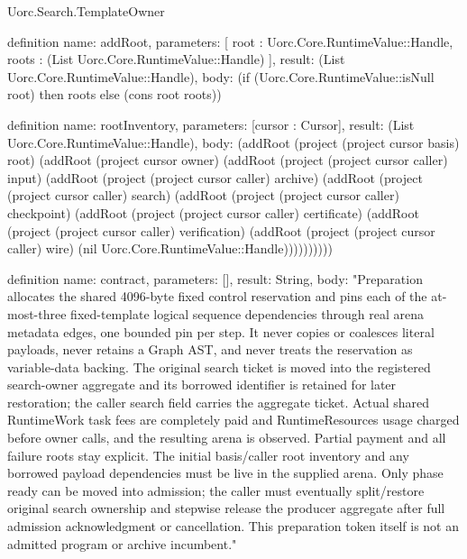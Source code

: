 \begin{lexlean}{Uorc.Search.TemplateOwner}
\begin{semanticmodule}
definition{
  name: addRoot,
  parameters: [
    root : Uorc.Core.RuntimeValue::Handle,
    roots : (List Uorc.Core.RuntimeValue::Handle)
  ],
  result: (List Uorc.Core.RuntimeValue::Handle),
  body: (if (Uorc.Core.RuntimeValue::isNull root) then roots else (cons root roots))
}

definition{
  name: rootInventory,
  parameters: [cursor : Cursor],
  result: (List Uorc.Core.RuntimeValue::Handle),
  body: (addRoot (project (project cursor basis) root) (addRoot (project cursor owner) (addRoot (project (project cursor caller) input) (addRoot (project (project cursor caller) archive) (addRoot (project (project cursor caller) search) (addRoot (project (project cursor caller) checkpoint) (addRoot (project (project cursor caller) certificate) (addRoot (project (project cursor caller) verification) (addRoot (project (project cursor caller) wire) (nil Uorc.Core.RuntimeValue::Handle))))))))))
}

definition{
  name: contract,
  parameters: [],
  result: String,
  body: "Preparation allocates the shared 4096-byte fixed control reservation and pins each of the at-most-three fixed-template logical sequence dependencies through real arena metadata edges, one bounded pin per step. It never copies or coalesces literal payloads, never retains a Graph AST, and never treats the reservation as variable-data backing. The original search ticket is moved into the registered search-owner aggregate and its borrowed identifier is retained for later restoration; the caller search field carries the aggregate ticket. Actual shared RuntimeWork task fees are completely paid and RuntimeResources usage charged before owner calls, and the resulting arena is observed. Partial payment and all failure roots stay explicit. The initial basis/caller root inventory and any borrowed payload dependencies must be live in the supplied arena. Only phase ready can be moved into admission; the caller must eventually split/restore original search ownership and stepwise release the producer aggregate after full admission acknowledgment or cancellation. This preparation token itself is not an admitted program or archive incumbent."
}
\end{semanticmodule}
\end{lexlean}
